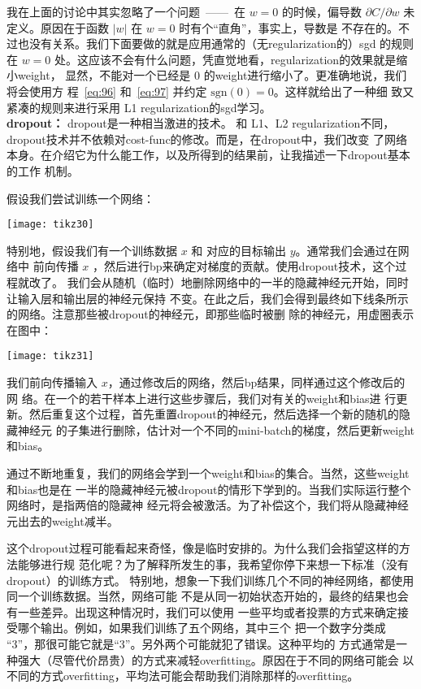 我在上面的讨论中其实忽略了一个问题~——~在 $w=0$ 的时候，偏导数 $\partial
C/\partial w$ 未定义。原因在于函数 $|w|$ 在 $w=0$ 时有个“直角”，事实上，导数是
不存在的。不过也没有关系。我们下面要做的就是应用通常的（无\gls*{regularization}的）\gls*{sgd}
的规则在 $w=0$ 处。这应该不会有什么问题，凭直觉地看，\gls*{regularization}的效果就是缩小\gls*{weight}，
显然，不能对一个已经是 $0$ 的\gls*{weight}进行缩小了。更准确地说，我们将会使用方
程~\eqref{eq:96} 和~\eqref{eq:97} 并约定 $\mbox{sgn}(0) = 0$。这样就给出了一种细
致又紧凑的规则来进行采用 L1 \gls*{regularization}的\gls*{sgd}学习。\\

\textbf{\gls{dropout}：} \gls*{dropout}是一种相当激进的技术。
和 L1、L2 \gls*{regularization}不同，\gls*{dropout}技术并不依赖对\gls*{cost-func}的修改。而是，在\gls*{dropout}中，我们改变
了网络本身。在介绍它为什么能工作，以及所得到的结果前，让我描述一下\gls*{dropout}基本的工作
机制。

假设我们尝试训练一个网络：
\begin{center}
  \texttt{[image: tikz30]}
\end{center}

特别地，假设我们有一个训练数据 $x$ 和 对应的目标输出 $y$。通常我们会通过在网络中
前向传播 $x$ ，然后进行\gls*{bp}来确定对梯度的贡献。使用\gls*{dropout}技术，这个过程就改了。
我们会从随机（临时）地删除网络中的一半的隐藏神经元开始，同时让输入层和输出层的神经元保持
不变。在此之后，我们会得到最终如下线条所示的网络。注意那些被\gls*{dropout}的神经元，即那些临时被删
除的神经元，用虚圈表示在图中：
\begin{center}
  \texttt{[image: tikz31]}
\end{center}

我们前向传播输入 $x$，通过修改后的网络，然后\gls*{bp}结果，同样通过这个修改后的网
络。在一个的若干样本上进行这些步骤后，我们对有关的\gls*{weight}和\gls*{bias}进
行更新。然后重复这个过程，首先重置\gls*{dropout}的神经元，然后选择一个新的随机的隐藏神经元
的子集进行删除，估计对一个不同的\gls*{mini-batch}的梯度，然后更新\gls*{weight}和\gls*{bias}。

通过不断地重复，我们的网络会学到一个\gls*{weight}和\gls*{bias}的集合。当然，这些\gls*{weight}和\gls*{bias}也是在
一半的隐藏神经元被\gls*{dropout}的情形下学到的。当我们实际运行整个网络时，是指两倍的隐藏神
经元将会被激活。为了补偿这个，我们将从隐藏神经元出去的\gls*{weight}减半。

这个\gls*{dropout}过程可能看起来奇怪，像是临时安排的。为什么我们会指望这样的方法能够进行规
范化呢？为了解释所发生的事，我希望你停下来想一下标准（没有\gls*{dropout}）的训练方式。
特别地，想象一下我们训练几个不同的神经网络，都使用同一个训练数据。当然，网络可能
不是从同一初始状态开始的，最终的结果也会有一些差异。出现这种情况时，我们可以使用
一些平均或者投票的方式来确定接受哪个输出。例如，如果我们训练了五个网络，其中三个
把一个数字分类成 “3”，那很可能它就是“3”。另外两个可能就犯了错误。这种平均的
方式通常是一种强大（尽管代价昂贵）的方式来减轻\gls*{overfitting}。原因在于不同的网络可能会
以不同的方式\gls*{overfitting}，平均法可能会帮助我们消除那样的\gls*{overfitting}。

